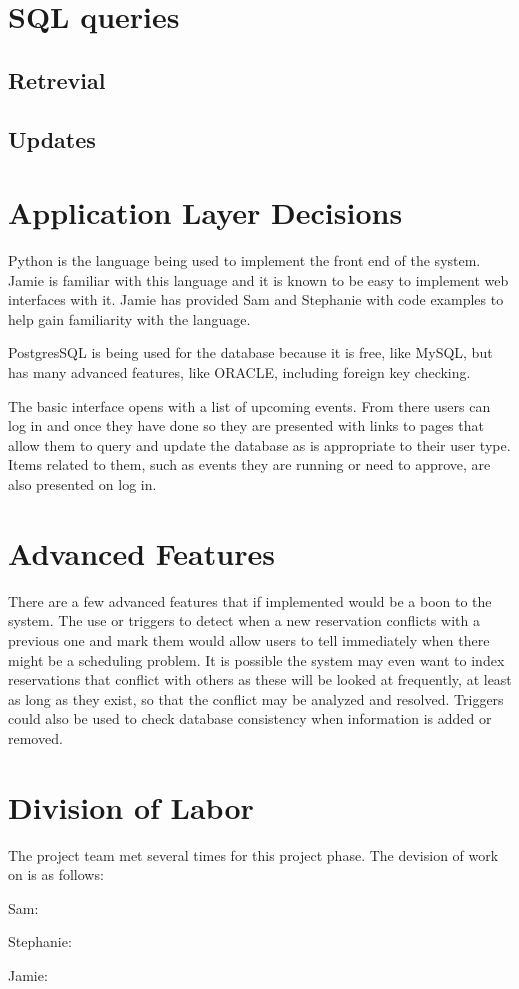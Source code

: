 \documentclass{article}
\begin{document}
\section{SQL queries}
\subsection{Retrevial}


\subsection{Updates}


\section{Application Layer Decisions}
Python is the language being used to implement the front end of the system. Jamie is familiar with this language
and it is known to be easy to implement web interfaces with it. Jamie has provided Sam and Stephanie with code examples
to help gain familiarity with the language.

PostgresSQL is being used for the database because it is free, like MySQL, but has many advanced features, like ORACLE,
including foreign key checking.

The basic interface opens with a list of upcoming events. From there users can log in and once they have done so they are presented
with links to pages that allow them to query and update the database as is appropriate to their user type. Items related to them,
such as events they are running or need to approve, are also presented on log in.


\section{Advanced Features}
There are a few advanced features that if implemented would be a boon to the system. The use or triggers to detect
when a new reservation conflicts with a previous one and mark them would allow users to tell immediately when there
might be a scheduling problem. It is possible the system may even want to index reservations that conflict with others
as these will be looked at frequently, at least as long as they exist, so that the conflict may be analyzed and resolved.
Triggers could also be used to check database consistency when information is added or removed.


\section{Division of Labor}
The project team met several times for this project phase. The devision of work on is as follows:

Sam:
\begin{itemize}

\end{itemize}

Stephanie:
\begin{itemize}

\end{itemize}

Jamie:
\begin{itemize}

\end{itemize}
\end{document}
